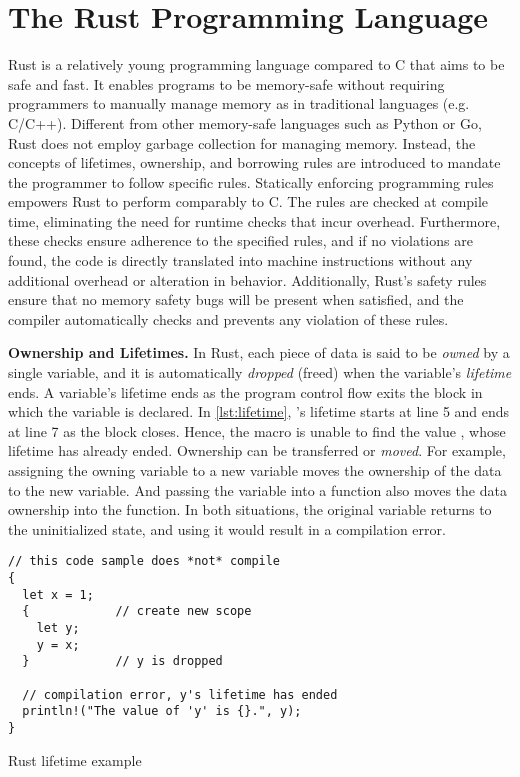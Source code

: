 \section{The Rust Programming Language}
Rust is a relatively young programming language compared to C that aims to be
safe and fast.
It enables programs to be memory-safe without requiring programmers to manually
manage memory as in traditional languages (e.g. C/C++).
Different from other memory-safe languages such as Python or Go, Rust does not
employ garbage collection for managing memory. Instead, the concepts of
lifetimes, ownership, and borrowing rules are introduced to mandate the
programmer to follow specific rules.
Statically enforcing programming rules empowers Rust to perform comparably to
C. The rules are checked at compile time, eliminating the need for runtime
checks that incur overhead. Furthermore, these checks ensure adherence to the
specified rules, and if no violations are found, the code is directly
translated into machine instructions without any additional overhead or
alteration in behavior.
Additionally, Rust's safety rules ensure that no memory safety bugs will be
present when satisfied, and the compiler automatically checks and prevents any
violation of these rules.

\textbf{Ownership and Lifetimes.}
In Rust, each piece of data is said to be \textit{owned} by a single
variable, and it is automatically \textit{dropped} (freed) when the
variable's \textit{lifetime} ends. A variable's lifetime ends as the program
control flow exits the block in which the variable is declared.
In \autoref{lst:lifetime}, 's lifetime starts at line 5 and ends at
line 7 as the block closes. Hence, the  macro is unable to find
the value , whose lifetime has already ended.
Ownership can be transferred or \textit{moved}. For example,
assigning the owning variable to a new variable moves the ownership of the
data to the new variable. And passing the variable into a function also moves
the data ownership into the function.
In both situations, the original variable returns to the uninitialized state,
and using it would result in a compilation error.

\begin{listing}[hbtp]
    \begin{verbatim}
// this code sample does *not* compile
{
  let x = 1;
  {            // create new scope
    let y;
    y = x;
  }            // y is dropped

  // compilation error, y's lifetime has ended
  println!("The value of 'y' is {}.", y);
}
    \end{verbatim}
    \caption{Rust lifetime example}
    \label{lst:lifetime}
    \vspace{-0.2cm}
\end{listing}

